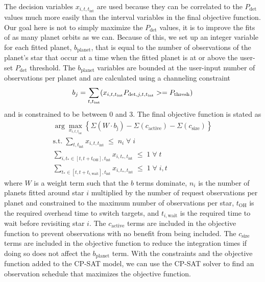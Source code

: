 The decision variables $x_{i, t, t_{\textrm{int}}}$ are used because they can
be correlated to the $P_\textrm{det}$ values much more easily than the interval
variables in the final objective function. Our goal here is not to simply
maximize the $P_\textrm{det}$ values, it is to improve the fits of as many
planet orbits as we can. Because of this, we set up an integer variable for each
fitted planet, $b_\textrm{planet}$, that is equal to the number of observations
of the planet's star that occur at a time when the fitted planet is at or above
the user-set $P_\textrm{det}$ threshold. The $b_\textrm{planet}$ variables are
bounded at the user-input number of observations per planet and are calculated
using a channeling constraint
\begin{equation}
  b_j = \sum_{t, t_\textrm{int}}(x_{i, t, t_\textrm{int}}P_{\textrm{det}, j, t, t_\textrm{int}} >= P_\textrm{thresh})\\
  \label{eq:bplanet}
\end{equation}
and is constrained to be between 0 and 3. The final objective function is stated as 
\begin{gather}
  \arg\max_{x_{i,t,t_\textrm{int}}}{\left\{ \Sigma\left(W \cdot
  b_\textrm{j}\right) - \Sigma\left( c_\textrm{active}\right) - \Sigma\left(
  c_\textrm{size}\right) \right\}}\\
  \textrm{s.t.} \; \sum_{t,t_\textrm{int}} x_{i,t,t_\textrm{int}} \; \leq \; n_i \; \forall \; i\\
  \sum_{i, t_*\in[t,t+t_\textrm{OH}], t_\textrm{int}} x_{i,t_*,t_\textrm{int}} \; \leq \; 1 \; \forall \; t\\
  \sum_{t_*\in[t,t+t_{i,\textrm{wait}}], t_\textrm{int}} x_{i,t_*,t_\textrm{int}} \; \leq \; 1 \; \forall \; i, t
 \label{eq:final_obj_function}
\end{gather}
where $W$ is a weight term such that the $b$ terms dominate, $n_i$ is the
number of planets fitted around star $i$ multiplied by the number of request
observations per planet and constrained to the maximum number of observations
per star, $t_\textrm{OH}$ is the required overhead time to switch targets, and
$t_{i,\textrm{wait}}$ is the required time to wait before revisiting star $i$.
The $c_\textrm{active}$ terms are included in the objective function to prevent
observations with no benefit from being included. The $c_\textrm{size}$ terms
are included in the objective function to reduce the integration times if doing
so does not affect the $b_\textrm{planet}$ term. With the constraints and the
objective function added to the CP-SAT model, we can use the CP-SAT solver to
find an observation schedule that maximizes the objective function.

